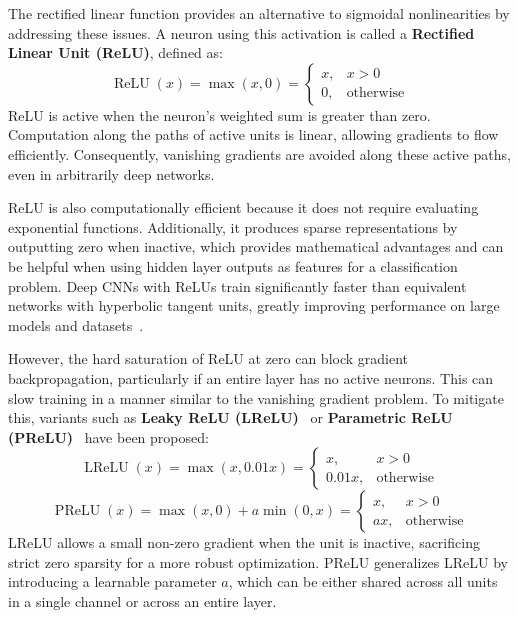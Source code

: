 The rectified linear function provides an alternative to sigmoidal nonlinearities by addressing these issues. A neuron using this activation is called a \textbf{Rectified Linear Unit (ReLU)}, defined as:
\begin{equation}
    \operatorname{ReLU}(x) = \max(x, 0) = \begin{cases} x, & x > 0\\ 0, & \text{otherwise} \end{cases}
\end{equation}
ReLU is active when the neuron's weighted sum is greater than zero. Computation along the paths of active units is linear, allowing gradients to flow efficiently. Consequently, vanishing gradients are avoided along these active paths, even in arbitrarily deep networks.

ReLU is also computationally efficient because it does not require evaluating exponential functions. Additionally, it produces sparse representations by outputting zero when inactive, which provides mathematical advantages and can be helpful when using hidden layer outputs as features for a classification problem. Deep CNNs with ReLUs train significantly faster than equivalent networks with hyperbolic tangent units, greatly improving performance on large models and datasets~\cite{Krizhevsky2012}.

However, the hard saturation of ReLU at zero can block gradient backpropagation, particularly if an entire layer has no active neurons. This can slow training in a manner similar to the vanishing gradient problem. To mitigate this, variants such as \textbf{Leaky ReLU (LReLU)}~\cite{Maas2013} or \textbf{Parametric ReLU (PReLU)}~\cite{He2015} have been proposed:
\begin{equation}
    \operatorname{LReLU}(x) = \max(x, 0.01x) = \begin{cases} x, & x > 0\\ 0.01x, & \text{otherwise} \end{cases}
\end{equation}
\begin{equation}
    \operatorname{PReLU}(x) = \max(x, 0) + a\min(0, x) = \begin{cases} x, & x > 0\\ ax, & \text{otherwise} \end{cases}
\end{equation}
LReLU allows a small non-zero gradient when the unit is inactive, sacrificing strict zero sparsity for a more robust optimization. PReLU generalizes LReLU by introducing a learnable parameter $a$, which can be either shared across all units in a single channel or across an entire layer.~\cite{Maas2013, Glorot2011}

